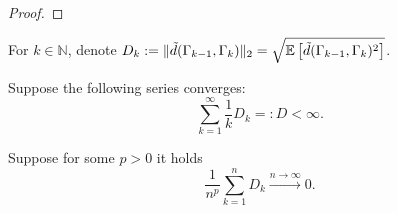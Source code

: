 \begin{lemma}
\begin{proof}
\end{proof}
\end{lemma}

For $k \in \mathbb{N}$, denote $D_k := \|\tilde{d}(\Gamma_{k-1}, \Gamma_k) \|_2 = \sqrt{\mathbb{E} \left[ \tilde{d}(\Gamma_{k-1}, \Gamma_k)^2 \right]}$.
\begin{assumption}
\label{a:adaptation-strong}
 Suppose the following series converges:
\[
\sum_{k=1}^{\infty} \frac{1}{k} D_k =: D < \infty.
\]

\end{assumption}
\begin{assumption}
\label{a:adaptation-weak}
Suppose for some $p > 0$ it holds
\[
\frac{1}{n^p} \sum_{k=1}^n D_k \xrightarrow{n \to \infty} 0.
\]

\end{assumption}


